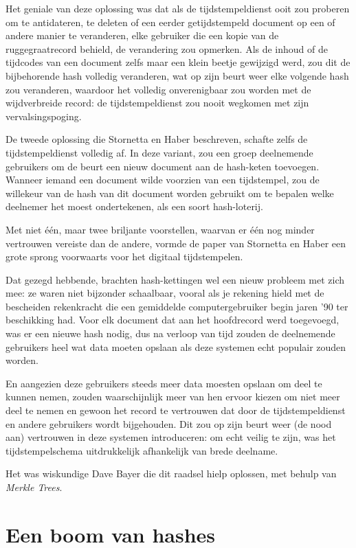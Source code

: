 \documentclass[
  a5paper,
  smalldemyvopaper,11pt,twoside,onecolumn,openright,extrafontsizes]{memoir}
\begin{document}
Het geniale van deze oplossing was dat als de tijdstempeldienst ooit zou
proberen om te antidateren, te deleten of een eerder getijdstempeld
document op een of andere manier te veranderen, elke gebruiker die een
kopie van de ruggegraatrecord behield, de verandering zou opmerken. Als
de inhoud of de tijdcodes van een document zelfs maar een klein beetje
gewijzigd werd, zou dit de bijbehorende hash volledig veranderen, wat op
zijn beurt weer elke volgende hash zou veranderen, waardoor het volledig
onverenigbaar zou worden met de wijdverbreide record: de
tijdstempeldienst zou nooit wegkomen met zijn vervalsingspoging.

De tweede oplossing die Stornetta en Haber beschreven, schafte zelfs de
tijdstempeldienst volledig af. In deze variant, zou een groep
deelnemende gebruikers om de beurt een nieuw document aan de hash-keten
toevoegen. Wanneer iemand een document wilde voorzien van een
tijdstempel, zou de willekeur van de hash van dit document worden
gebruikt om te bepalen welke deelnemer het moest ondertekenen, als een
soort hash-loterij.

Met niet één, maar twee briljante voorstellen, waarvan er één nog minder
vertrouwen vereiste dan de andere, vormde de paper van Stornetta en
Haber een grote sprong voorwaarts voor het digitaal tijdstempelen.

Dat gezegd hebbende, brachten hash-kettingen wel een nieuw probleem met
zich mee: ze waren niet bijzonder schaalbaar, vooral als je rekening
hield met de bescheiden rekenkracht die een gemiddelde computergebruiker
begin jaren '90 ter beschikking had. Voor elk document dat aan het
hoofdrecord werd toegevoegd, was er een nieuwe hash nodig, dus na
verloop van tijd zouden de deelnemende gebruikers heel wat data moeten
opslaan als deze systemen echt populair zouden worden.

En aangezien deze gebruikers steeds meer data moesten opslaan om deel te
kunnen nemen, zouden waarschijnlijk meer van hen ervoor kiezen om niet
meer deel te nemen en gewoon het record te vertrouwen dat door de
tijdstempeldienst en andere gebruikers wordt bijgehouden. Dit zou op
zijn beurt weer (de nood aan) vertrouwen in deze systemen introduceren:
om echt veilig te zijn, was het tijdstempelschema uitdrukkelijk
afhankelijk van brede deelname.

Het was wiskundige Dave Bayer die dit raadsel hielp oplossen, met behulp
van \emph{Merkle Trees}.

\section{Een boom van hashes}\label{een-boom-van-hashes}
\end{document}

